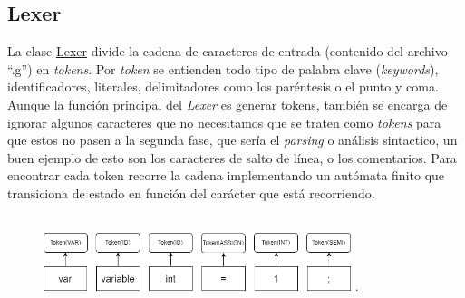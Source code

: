 \subsection{Lexer}
La clase \href{https://github.com/domingoUnican/TFGPedroCastro/blob/main/code/compilerGoneFSR/gone/tokenizer.py}{Lexer} divide la cadena de caracteres de entrada (contenido del archivo ``.g'') en \textit{tokens}. Por \textit{token} se entienden todo tipo de palabra clave (\textit{keywords}), identificadores, literales, delimitadores como los paréntesis o el punto y coma. Aunque la función principal del \textit{Lexer} es generar tokens, también se encarga de ignorar algunos caracteres que no necesitamos que se traten como \textit{tokens} para que estos no pasen a la segunda fase, que sería el \textit{parsing} o análisis sintactico, un buen ejemplo de esto son los caracteres de salto de línea, o los comentarios. Para encontrar cada token recorre la cadena implementando un autómata finito que transiciona de estado en función del carácter que está recorriendo.\\\\
\begin{figure}[h] 
    \centering
    \includegraphics[width=0.8\textwidth,keepaspectratio]{img/tokens.png} .
    \label{fig:mi_imagen}
\end{figure}
\\\\
